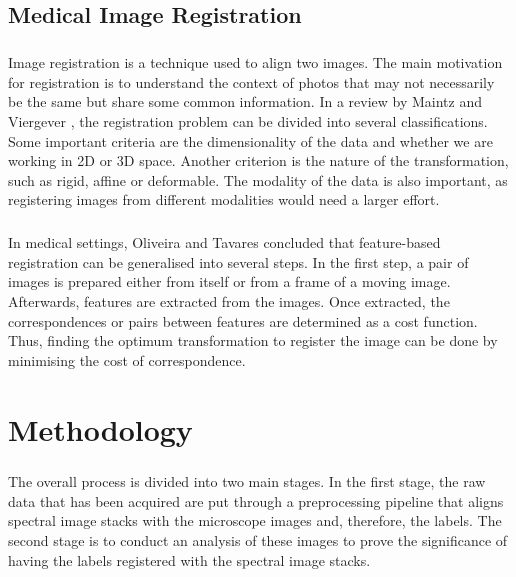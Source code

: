 \documentclass[12pt,oneside]{report}
\begin{document}
\section{Medical Image Registration}
\paragraph{}
Image registration is a technique used to align two images. The main motivation for registration is to understand the context of photos that may not necessarily be the same but share some common information. In a review by Maintz and Viergever \cite{maintz_survey_1998}, the registration problem can be divided into several classifications. Some important criteria are the dimensionality of the data and whether we are working in 2D or 3D space. Another criterion is the nature of the transformation, such as rigid, affine or deformable. The modality of the data is also important, as registering images from different modalities would need a larger effort.

\paragraph{}
In medical settings, Oliveira and Tavares \cite{oliveira_medical_2014} concluded that feature-based registration can be generalised into several steps. In the first step, a pair of images is prepared either from itself or from a frame of a moving image. Afterwards, features are extracted from the images. Once extracted, the correspondences or pairs between features are determined as a cost function. Thus, finding the optimum transformation to register the image can be done by minimising the cost of correspondence.


\chapter{Methodology}

\paragraph{}
The overall process is divided into two main stages. In the first stage, the raw data that has been acquired are put through a preprocessing pipeline that aligns spectral image stacks with the microscope images and, therefore, the labels. The second stage is to conduct an analysis of these images to prove the significance of having the labels registered with the spectral image stacks.
\end{document}
